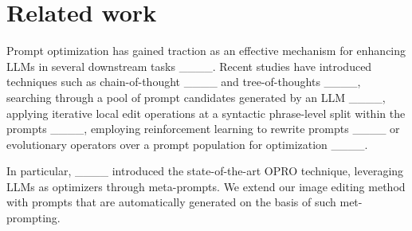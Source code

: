 \section{Related work}
Prompt optimization has gained traction as an effective mechanism for enhancing LLMs in several downstream tasks ____.
Recent studies have introduced techniques such as chain-of-thought ____ and tree-of-thoughts ____, searching through a pool of prompt candidates generated by an LLM ____, applying iterative local edit operations at a syntactic phrase-level split within the prompts ____, employing reinforcement learning to rewrite prompts ____ or evolutionary operators over a prompt population for optimization ____.

In particular, ____ introduced the state-of-the-art OPRO technique, leveraging LLMs as optimizers through meta-prompts. %
We extend our image editing method with prompts that are automatically generated on the basis of such met-prompting.